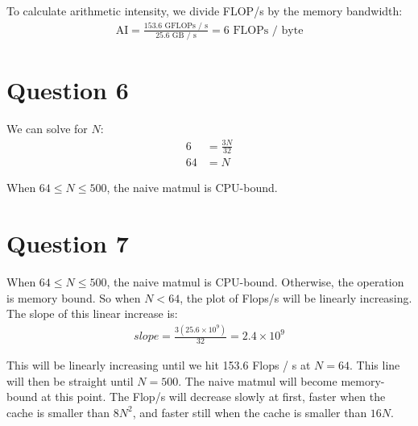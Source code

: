 \documentclass[11pt]{article}
\begin{document}
        To calculate arithmetic intensity, we divide FLOP/s by the memory bandwidth:
        \begin{align*}
            \text{AI} = \frac{153.6 \text{ GFLOPs / s}}{25.6 \text{ GB / s}} = 6 \text{ FLOPs / byte}
        \end{align*}

    \section*{Question 6}
        We can solve for $N$:
        \begin{align*}
            6 &= \frac{3N}{32}\\[0.5em]
            64 &= N
        \end{align*}

        When $64 \leq N \leq 500$, the naive matmul is CPU-bound.

    \section*{Question 7}
        When $64 \leq N \leq 500$, the naive matmul is CPU-bound. Otherwise, the operation is memory bound. So when $N < 64$, the plot of Flops/s will be linearly increasing. The slope of this linear increase is:
        \begin{align*}
            slope = \frac{3(25.6\times 10^9)}{32} = 2.4 \times 10^9
        \end{align*}

        This will be linearly increasing until we hit 153.6 Flops / s at $N = 64$. This line will then be straight until $N = 500$. The naive matmul will become memory-bound at this point. The Flop/s will decrease slowly at first, faster when the cache is smaller than $8N^2$, and faster still when the cache is smaller than $16N$.
\end{document}
